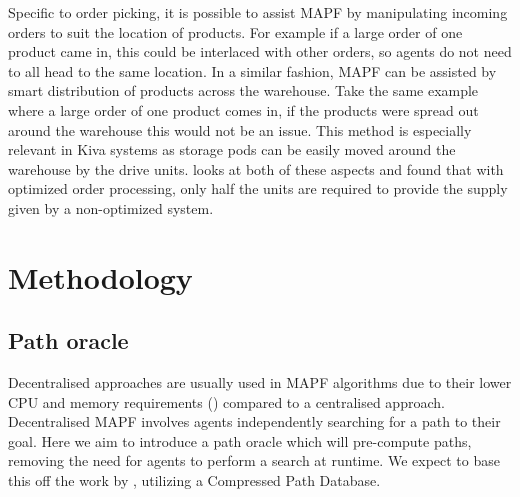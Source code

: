 \documentclass[a4paper,11pt]{article}
\begin{document}

Specific to order picking, it is possible to assist MAPF by manipulating incoming orders to suit the location of products. For example if a large order of one product came in, this could be interlaced with other orders, so agents do not need to all head to the same location. In a similar fashion, MAPF can be assisted by smart distribution of products across the warehouse. Take the same example where a large order of one product comes in, if the products were spread out around the warehouse this would not be an issue. This method is especially relevant in Kiva systems as storage pods can be easily moved around the warehouse by the drive units. \cite{boysen2017parts} looks at both of these aspects and found that with optimized order processing, only half the units are required to provide the supply given by a non-optimized system.







\section{Methodology}
\label{Research}
\subsection{Path oracle}

Decentralised approaches are usually used in MAPF algorithms due to their lower CPU and memory requirements (\cite{wang2009bridging}) compared to a centralised approach. Decentralised MAPF involves agents independently searching for a path to their goal. Here we aim to introduce a path oracle which will pre-compute paths, removing the need for agents to perform a search at runtime. We expect to base this off the work by \cite{strasser2015compressing}, utilizing a Compressed Path Database.
\end{document}
